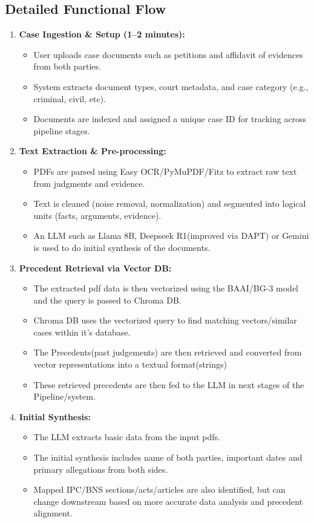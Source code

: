\subsection{Detailed Functional Flow}
\begin{enumerate}
	\item \textbf{Case Ingestion \& Setup (1--2 minutes):}
	\begin{itemize}
		\item User uploads case documents such as petitions and affidavit of evidences from both parties.
		\item System extracts document types, court metadata, and case category (e.g., criminal, civil, etc).
		\item Documents are indexed and assigned a unique case ID for tracking across pipeline stages.
	\end{itemize}
	
	\item \textbf{Text Extraction \& Pre-processing:}
	\begin{itemize}
		\item PDFs are parsed using Easy OCR/PyMuPDF/Fitz to extract raw text from judgments and evidence.
		\item Text is cleaned (noise removal, normalization) and segmented into logical units (facts, arguments, evidence).
		\item An LLM such as Llama 8B, Deepseek R1(improved via DAPT) or Gemini is used to do initial synthesis of the documents.
	\end{itemize}
	
	
	\item \textbf{Precedent Retrieval via Vector DB:}
	\begin{itemize}
		\item The extracted pdf data is then vectorized using the BAAI/BG-3 model and the query is passed to Chroma DB.
		\item Chroma DB uses the vectorized query to find matching vectors/similar cases within it's database.
		\item The Precedents(past judgements) are then retrieved and converted from vector representations into a textual format(strings)
		\item These retrieved precedents are then fed to the LLM in next stages of the Pipeline/system.
	\end{itemize}
	
	
		\item \textbf{Initial Synthesis:}
	\begin{itemize}
		\item The LLM extracts basic data from the input pdfs.
		\item The initial synthesis includes name of both parties, important dates and primary allegations from both sides.
		\item Mapped IPC/BNS sections/acts/articles are also identified, but can change downstream based on more accurate data analysis and precedent alignment.
	\end{itemize}
	

\end{enumerate}
